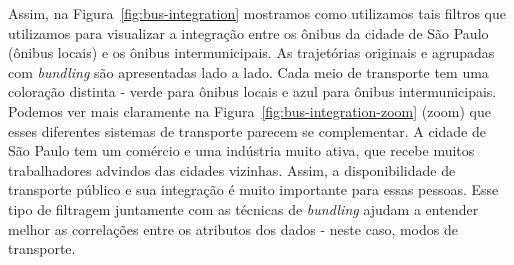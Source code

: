 Assim, na Figura~\ref{fig:bus-integration} mostramos como utilizamos tais
filtros que utilizamos para visualizar a integração entre os ônibus da cidade de
São Paulo (ônibus locais) e os ônibus intermunicipais. As trajetórias originais
e agrupadas com \emph{bundling} são apresentadas lado a lado. Cada meio de
transporte tem uma coloração distinta - verde para ônibus locais e azul para
ônibus intermunicipais. Podemos ver mais claramente na
Figura~\ref{fig:bus-integration-zoom} (zoom) que esses diferentes sistemas de
transporte parecem se complementar. A cidade de São Paulo tem um comércio e uma
indústria muito ativa, que recebe muitos trabalhadores advindos das cidades
vizinhas. Assim, a disponibilidade de transporte público e sua integração é
muito importante para essas pessoas. Esse tipo de filtragem juntamente com as
técnicas de \emph{bundling} ajudam a entender melhor as correlações entre os
atributos dos dados - neste caso, modos de transporte.


